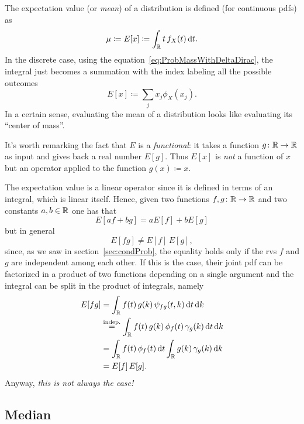 \documentclass[
	10pt,
	draft
]{scrreprt}
\begin{document}
The expectation value (or \emph{mean}) of a distribution is defined (for continuous \acp{pdf}) as
\begin{equation}
\mu\coloneqq E[x]\coloneqq \int_{\mathbb{R}} t\,f_X(t)\mathop{}\!\mathrm{d} t.
\end{equation}
In the discrete case, using the equation~\eqref{eq:ProbMassWithDeltaDirac}, the integral just becomes a summation with the index labeling all the possible outcomes
\begin{equation}
E[x] \coloneqq \sum_j x_j\phi_X(x_j).
\end{equation}
In a certain sense, evaluating the mean of a distribution looks like evaluating its ``center of mass''.


It's worth remarking the fact that $E$ is a \emph{functional}: it takes a function $g\colon\mathbb{R}\to\mathbb{R}$ as input and gives back a real number $E[g]$.
Thus $E[x]$ is \emph{not} a function of $x$ but an operator applied to the function $g(x) \coloneqq x$.


The expectation value is a linear operator since it is defined in terms of an integral, which is linear itself.
Hence, given two functions $f,g\colon \mathbb{R}\to\mathbb{R}$ and two constants $a,b\in\mathbb{R}$ one has that 
\begin{equation}
E[af + b g] = aE[f] + bE[g]
\end{equation}
but in general
\begin{equation}
E[fg]\neq E[f]\,E[g],
\end{equation}
since, as we saw in section~\ref{sec:condProb}, the equality holds only if the \acp{rv} $f$ and $g$ are independent among each other.
If this is the case, their joint \ac{pdf} can be factorized in a product of two functions depending on a single argument and the integral can be split in the product of integrals, namely
\begin{equation}
\begin{aligned}
E[fg]
&= \int_{\mathbb{R}} f(t)\,g(k)\,\psi_{fg}(t,k)\mathop{}\!\mathrm{d} t\mathop{}\!\mathrm{d} k\\
& \overset{\text{indep.}}{=} \int_{\mathbb{R}} f(t)\,g(k)\,\phi_{f}(t)\,\gamma_g(k)\mathop{}\!\mathrm{d} t\mathop{}\!\mathrm{d} k\\
&= \int_{\mathbb{R}} f(t)\,\phi_{f}(t)\mathop{}\!\mathrm{d} t\int_{\mathbb{R}} g(k)\,\gamma_g(k)\mathop{}\!\mathrm{d} k\\
&= E[f]\,E[g].
\end{aligned}
\end{equation}
Anyway, \emph{this is not always the case!}


			\subsection{Median}
\end{document}
